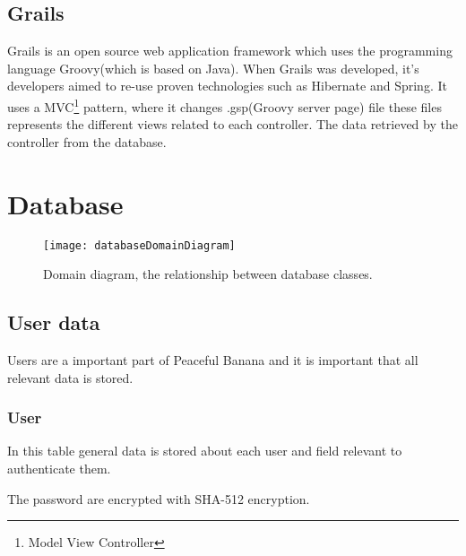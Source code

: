 \subsection{Grails}
Grails is an open source web application framework which uses the programming language Groovy(which is based on Java). When Grails was developed, it's developers aimed to re-use proven technologies such as Hibernate and Spring. It uses a MVC\footnote{Model View Controller} pattern, where it changes .gsp(Groovy server page) file these files represents the different views related to each controller. The data retrieved by the controller from the database.

\section{Database}
\begin{figure}[h!]
\centering
	\texttt{[image: databaseDomainDiagram]}
\caption{Domain diagram, the relationship between database classes.}
\label{newnotification}
\end{figure}

\subsection{User data}
Users are a important part of Peaceful Banana and it is important that all relevant data is stored. \\

\subsubsection*{User}
In this table general data is stored about each user and field relevant to authenticate them.

The password are encrypted with SHA-512 encryption.\\

